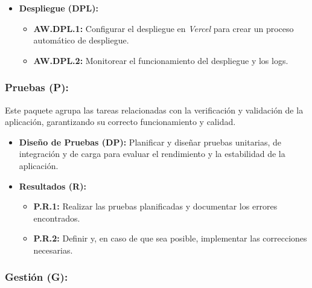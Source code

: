 \begin{itemize}
    \item \textbf{Despliegue (DPL):}
          \begin{itemize}
              \item \textbf{AW.DPL.1:} Configurar el despliegue en \textit{Vercel} para crear un proceso automático de despliegue.
              \item \textbf{AW.DPL.2:} Monitorear el funcionamiento del despliegue y los logs.
          \end{itemize}
\end{itemize}

\subsubsection{Pruebas (P):}

Este paquete agrupa las tareas relacionadas con la verificación y validación de la aplicación, garantizando su correcto funcionamiento y calidad.

\begin{itemize}
    \item \textbf{Diseño de Pruebas (DP):} Planificar y diseñar pruebas unitarias, de integración y de carga para evaluar el rendimiento y la estabilidad de la aplicación.
    \item \textbf{Resultados (R):}
          \begin{itemize}
              \item \textbf{P.R.1:} Realizar las pruebas planificadas y documentar los errores encontrados.
              \item \textbf{P.R.2:} Definir y, en caso de que sea posible, implementar las correcciones necesarias.
          \end{itemize}
\end{itemize}

\subsubsection{Gestión (G):}

